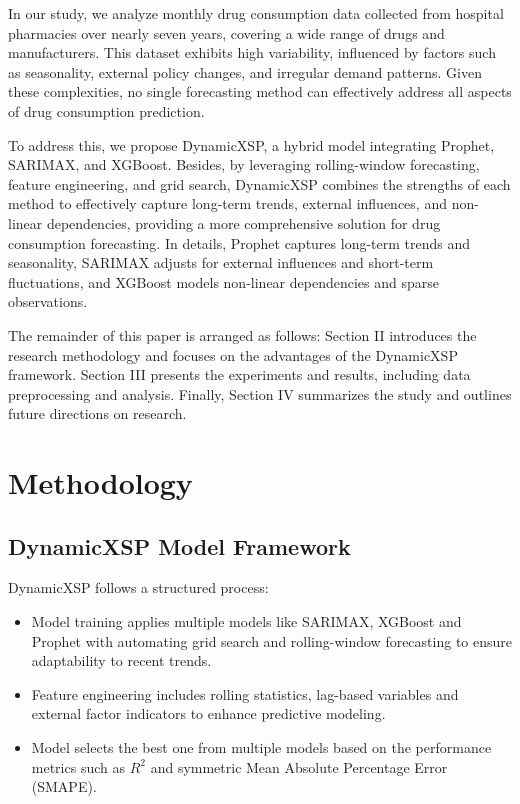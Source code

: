 \documentclass[journal]{IEEEtran}
\begin{document}
In our study, we analyze monthly drug consumption data collected from hospital pharmacies over nearly seven years, covering a wide range of drugs and manufacturers. This dataset exhibits high variability, influenced by factors such as seasonality, external policy changes, and irregular demand patterns. Given these complexities, no single forecasting method can effectively address all aspects of drug consumption prediction. 

To address this, we propose DynamicXSP, a hybrid model integrating Prophet, SARIMAX, and XGBoost. Besides, by leveraging rolling-window forecasting, feature engineering, and grid search, DynamicXSP combines the strengths of each method to effectively capture long-term trends, external influences, and non-linear dependencies, providing a more comprehensive solution for drug consumption forecasting. In details, Prophet captures long-term trends and seasonality, SARIMAX adjusts for external influences and short-term fluctuations, and XGBoost models non-linear dependencies and sparse observations.

The remainder of this paper is arranged as follows: Section II introduces the research methodology and focuses on the advantages of the DynamicXSP framework. Section III presents the experiments and results, including data preprocessing and analysis. Finally, Section IV summarizes the study and outlines future directions on research.

\section{Methodology}
\subsection{DynamicXSP Model Framework}

 DynamicXSP follows a structured process:

\begin{itemize}
    \item Model training applies multiple models like SARIMAX, XGBoost and Prophet with automating grid search and rolling-window forecasting to ensure adaptability to recent trends.
    \item Feature engineering includes rolling statistics, lag-based variables and external factor indicators to enhance predictive modeling.
    \item Model selects the best one from multiple models based on the performance metrics such as \( R^2 \) and symmetric Mean Absolute Percentage Error (SMAPE).
\end{itemize}
\end{document}
